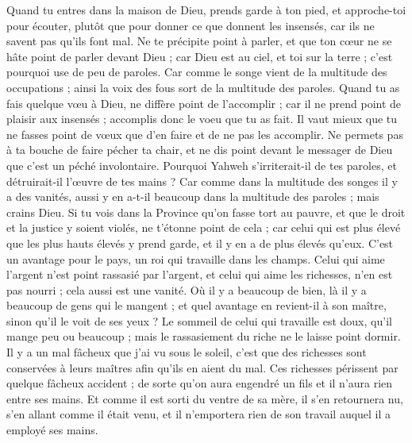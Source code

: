 \begin{multicols}{2}
Quand tu entres dans la maison de Dieu, prends garde à ton pied, et approche-toi pour écouter, plutôt que pour donner ce que donnent les insensés, car ils ne savent pas qu'ils font mal.
\VerseOne{}Ne te précipite point à parler, et que ton cœur ne se hâte point de parler devant Dieu ; car Dieu est au ciel, et toi sur la terre ; c'est pourquoi use de peu de paroles.
Car comme le songe vient de la multitude des occupations ; ainsi la voix des fous sort de la multitude des  paroles.
Quand tu as fais quelque vœu à Dieu, ne diffère point de l'accomplir ; car il ne prend point de plaisir aux insensés ; accomplis donc le voeu que tu as fait.
Il vaut mieux que tu ne fasses point de vœux que d'en faire et de ne pas les accomplir.
Ne permets pas à ta bouche de faire pécher ta chair, et ne dis point devant le messager de Dieu que c'est un péché involontaire. Pourquoi Yahweh s'irriterait-il de tes paroles, et détruirait-il l'œuvre de tes mains ?
Car comme dans la multitude des songes il y a des vanités, aussi y en a-t-il beaucoup dans la multitude des paroles ; mais crains Dieu.
Si tu vois dans la Province qu'on fasse tort au pauvre, et que le droit et la justice y soient violés, ne t'étonne point de cela ; car celui qui est plus élevé que les plus hauts élevés y prend garde, et il y en a de plus élevés qu’eux.
C'est un avantage pour le pays, un roi qui travaille dans les champs.
Celui qui aime l'argent n'est point rassasié par l'argent, et celui qui aime les richesses, n'en est pas nourri ; cela aussi est une vanité. 
Où il y a beaucoup de bien, là il y a beaucoup de gens qui le mangent ; et quel avantage en revient-il à son maître, sinon qu'il le voit de ses yeux ? 
Le sommeil de celui qui travaille est doux, qu'il mange peu ou beaucoup ; mais le rassasiement du riche ne le laisse point dormir. 
Il y a un mal fâcheux que j'ai vu sous le soleil, c'est que des richesses sont conservées à leurs maîtres afin qu'ils en aient du mal. 
Ces richesses périssent par quelque fâcheux accident ; de sorte qu'on aura engendré un fils et il n'aura rien entre ses mains.
Et comme il est sorti du ventre de sa mère, il s'en retournera nu, s'en allant comme il était venu, et il n'emportera rien de son travail auquel il a employé ses mains.

\end{multicols}
